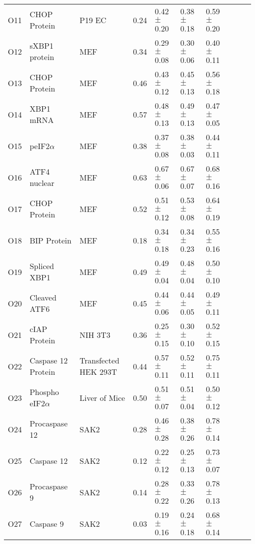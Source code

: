 \begin{center}
\begin{scriptsize}
\begin{supertabular}{l l l l l l l l l l}
O11 & CHOP Protein & P19 EC & 0.24 & 0.42 $\pm$ 0.20 & 0.38 $\pm$ 0.18 & 0.59 $\pm$ 0.20 & \cite{jimbo2003er} \\
O12 & sXBP1 protein & MEF & 0.34 & 0.29 $\pm$ 0.08 & 0.30 $\pm$ 0.06 & 0.40 $\pm$ 0.11  & \cite{calfon2002ire1} \\
O13 & CHOP Protein & MEF & 0.46 & 0.43 $\pm$ 0.12 & 0.45 $\pm$ 0.13 & 0.56 $\pm$ 0.18  & \cite{calfon2002ire1} \\
O14 & XBP1 mRNA & MEF &  0.57 & 0.48 $\pm$ 0.13 & 0.49 $\pm$ 0.13 & 0.47 $\pm$ 0.05  & \cite{calfon2002ire1} \\
O15 & peIF2$\alpha$ & MEF  & 0.38 & 0.37 $\pm$ 0.08 & 0.38 $\pm$ 0.03 & 0.44 $\pm$ 0.11 & \cite{yamamoto2007tim} \\
O16 & ATF4 nuclear & MEF & 0.63 & 0.67 $\pm$ 0.06 & 0.67 $\pm$ 0.07 & 0.68 $\pm$ 0.16  & \cite{yamamoto2007tim} \\
O17 & CHOP Protein & MEF & 0.52 & 0.51 $\pm$ 0.12 & 0.53 $\pm$ 0.08 & 0.64 $\pm$ 0.19 & \cite{yamamoto2007tim} \\
O18 & BIP Protein & MEF & 0.18 & 0.34 $\pm$ 0.18 & 0.34 $\pm$ 0.23 & 0.55 $\pm$ 0.16 & \cite{yamamoto2007tim} \\
O19 & Spliced XBP1 & MEF & 0.49 & 0.49 $\pm$ 0.04 & 0.48 $\pm$ 0.04 & 0.50 $\pm$ 0.10 & \cite{lee2002imu} \\
O20 & Cleaved ATF6 & MEF & 0.45 & 0.44 $\pm$ 0.06 & 0.44 $\pm$ 0.05 & 0.49 $\pm$ 0.11 & \cite{lee2002imu} \\
O21 & cIAP Protein & NIH 3T3 & 0.36 & 0.25 $\pm$ 0.15 & 0.30 $\pm$ 0.10 & 0.52 $\pm$ 0.15 & \cite{hamanaka2008pdr} \\
O22 & Caspase 12 Protein & Transfected HEK 293T & 0.44 & 0.57 $\pm$ 0.11 & 0.52 $\pm$ 0.11 & 0.75 $\pm$ 0.11 & \cite{Rao:2001fk} \\
O23 & Phospho eIF2$\alpha$ & Liver of Mice & 0.50 & 0.51 $\pm$ 0.07 & 0.51 $\pm$ 0.04 & 0.50 $\pm$ 0.12  & \cite{hetz2006pba} \\
O24 & Procaspase 12 & SAK2 & 0.28 & 0.46 $\pm$ 0.28 & 0.38 $\pm$ 0.26 & 0.78 $\pm$ 0.14 & \cite{rao2002cer} \\
O25 & Caspase 12 & SAK2 & 0.12 & 0.22 $\pm$ 0.12 & 0.25 $\pm$ 0.13 & 0.73 $\pm$ 0.07 & \cite{rao2002cer} \\
O26 & Procaspase 9 & SAK2 & 0.14 & 0.28 $\pm$ 0.22 & 0.33 $\pm$ 0.26 & 0.78 $\pm$ 0.13  & \cite{rao2002cer} \\
O27 & Caspase 9 & SAK2 & 0.03 & 0.19 $\pm$ 0.16 & 0.24 $\pm$ 0.18 & 0.68 $\pm$ 0.14  & \cite{rao2002cer} \\

\end{supertabular}
\end{scriptsize}
\end{center}
